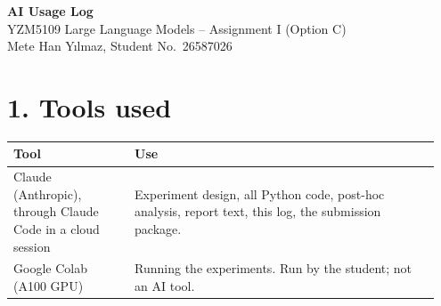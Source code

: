 \documentclass[11pt,a4paper]{article}
\begin{document}
\begin{center}
{\Large\bfseries AI Usage Log}\\[4pt]
YZM5109 Large Language Models -- Assignment I (Option C)\\
Mete Han Y\i lmaz, Student No.\ 26587026
\end{center}

\section*{1. Tools used}
\begin{tabular}{@{}>{\raggedright\arraybackslash}p{0.27\linewidth}>{\raggedright\arraybackslash}p{0.68\linewidth}@{}}\toprule
Tool & Use \\\midrule
Claude (Anthropic), through Claude Code in a cloud session & Experiment design, all Python code, post-hoc analysis, report text, this log, the submission package. \\
Google Colab (A100 GPU) & Running the experiments. Run by the student; not an AI tool. \\\bottomrule
\end{tabular}
\end{document}

